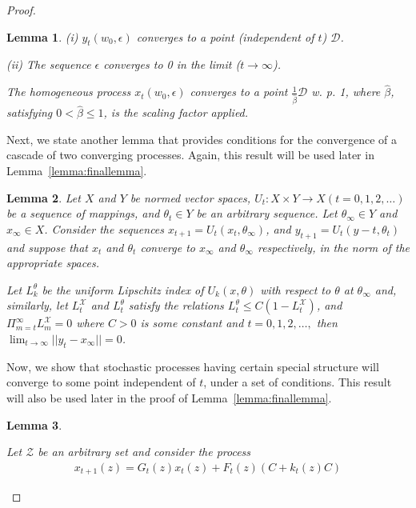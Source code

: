 \documentclass[jair, twoside,11pt,theapa]{article}
\newtheorem{lemm}{Lemma}
\begin{document}
\begin{proof}
\begin{lemm}
(i) $ y_t(w_0, \epsilon)$ converges to a point (independent of $t$) $\mathcal{D}$.

(ii) The sequence $\epsilon$ converges to 0 in the limit ($t \xrightarrow{} \infty$).

\noindent The homogeneous process $x_t(w_0, \epsilon)$ converges to a point $\frac{1}{\hat{\beta}} \mathcal{D}$ w. p. 1, where $\hat{\beta}$, satisfying $0 < \hat{\beta} \leq 1$, is the scaling factor applied.  
\end{lemm}

Next, we  state another lemma that provides conditions for the convergence of a cascade of two converging processes. Again, this result will be used later in Lemma~\ref{lemma:finallemma}. 





\begin{lemm}\label{lemma:normedvectorspace}
Let $X$ and $Y$ be normed vector spaces, $U_t: X \times Y \xrightarrow{} X (t=0,1,2, \ldots)$ be a sequence of mappings, and $\theta_t \in Y$ be an arbitrary sequence. Let $\theta_\infty \in Y$ and $x_\infty \in X$. Consider the sequences $x_{t+1} = U_t(x_t, \theta_\infty)$, and $y_{t+1} = U_t(y-t, \theta_t)$ and suppose that $x_t$ and $\theta_t$ converge to $x_\infty$ and $\theta_\infty$ respectively, in the norm of the appropriate spaces. 




Let $L^\theta_k$ be the uniform Lipschitz index of $U_k(x,\theta)$ with respect to $\theta$ at $\theta_\infty$ and, similarly, let $L^\mathscr{X}_t$ and $L^\theta_t$ satisfy the relations $L^\theta_t \leq C(1 - L^\mathscr{X}_t)$, and $\Pi_{m=t}^\infty L^\mathscr{X}_m = 0$ where $C>0$ is some constant and $t = 0,1,2, \ldots,$ then $\lim_{t \xrightarrow{} \infty} || y_t - x_\infty|| = 0$.
 
\end{lemm}


Now, we show that stochastic processes having certain special structure will converge to some point independent of $t$, under a set of conditions. This result will also be used later in the proof of Lemma~\ref{lemma:finallemma}. 

\begin{lemm}\label{lemm:boundedlemma}

Let $\mathcal{Z}$ be an arbitrary set and consider the process
\begin{equation}\label{eq:limitlemma}
    \begin{array}{l}
         x_{t+1}(z) = G_t(z)x_t(z) + F_t(z) (C + k_t(z) C)
    \end{array}{}
\end{equation}



\end{lemm}
\end{proof}
\end{document}

